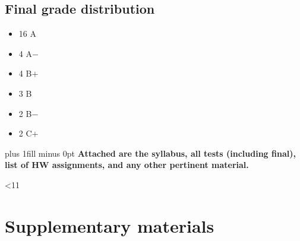 \documentclass[11pt,oneside]{amsart}
\begin{document}
\subsection{Final grade distribution}
\begin{itemize}
  \item 16 A
  \item 4 A$-$
  \item 4 B$+$
  \item 3 B
  \item 2 B$-$
  \item 2 C$+$
\end{itemize}


\vskip 0pt plus 1fill minus 0pt
\noindent
\textbf{Attached are the syllabus, all tests (including final), list of
  HW assignments, and any other pertinent material.}
\newpage






\setcounter{int}{1}
\loop

\addtocounter{int}{1}
\ifnum \value{int}<11
\repeat





\appendix
\section{Supplementary materials}

\end{document}

